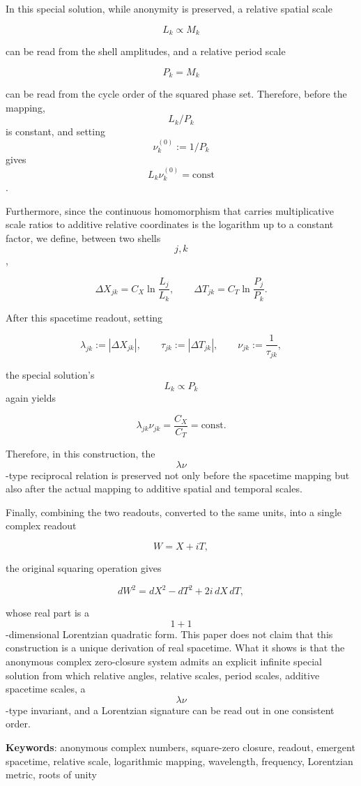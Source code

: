\documentclass[
  a4paper,
]{article}
\begin{document}
In this special solution, while anonymity is preserved, a relative
spatial scale

\[
L_k\propto M_k
\]

can be read from the shell amplitudes, and a relative period scale

\[
P_k=M_k
\]

can be read from the cycle order of the squared phase set. Therefore,
before the mapping, \[L_k/P_k\] is constant, and setting
\[\nu_k^{(0)}:=1/P_k\] gives \[L_k\nu_k^{(0)}=\mathrm{const}\].

Furthermore, since the continuous homomorphism that carries
multiplicative scale ratios to additive relative coordinates is the
logarithm up to a constant factor, we define, between two shells
\[j,k\],

\[
\Delta X_{jk}=C_X\ln\frac{L_j}{L_k},
\qquad
\Delta T_{jk}=C_T\ln\frac{P_j}{P_k}.
\]

After this spacetime readout, setting

\[
\lambda_{jk}:=|\Delta X_{jk}|,
\qquad
\tau_{jk}:=|\Delta T_{jk}|,
\qquad
\nu_{jk}:=\frac{1}{\tau_{jk}},
\]

the special solution's \[L_k\propto P_k\] again yields

\[
\lambda_{jk}\nu_{jk}
=
\frac{C_X}{C_T}
=
\mathrm{const}.
\]

Therefore, in this construction, the \[\lambda\nu\]-type reciprocal
relation is preserved not only before the spacetime mapping but also
after the actual mapping to additive spatial and temporal scales.

Finally, combining the two readouts, converted to the same units, into a
single complex readout

\[
W=X+iT,
\]

the original squaring operation gives

\[
dW^2=dX^2-dT^2+2i\,dX\,dT,
\]

whose real part is a \[1+1\]-dimensional Lorentzian quadratic form. This
paper does not claim that this construction is a unique derivation of
real spacetime. What it shows is that the anonymous complex zero-closure
system admits an explicit infinite special solution from which relative
angles, relative scales, period scales, additive spacetime scales, a
\[\lambda\nu\]-type invariant, and a Lorentzian signature can be read
out in one consistent order.

\textbf{Keywords}: anonymous complex numbers, square-zero closure,
readout, emergent spacetime, relative scale, logarithmic mapping,
wavelength, frequency, Lorentzian metric, roots of unity
\end{document}

